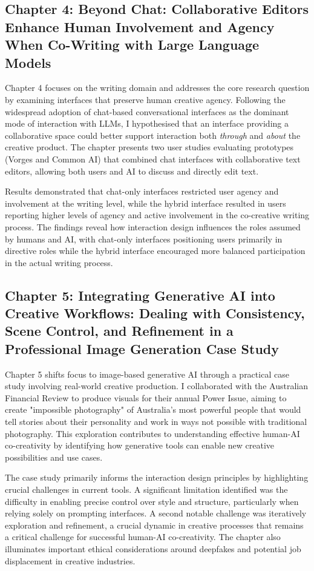 \subsection{Chapter 4: Beyond Chat: Collaborative Editors Enhance Human Involvement and Agency When Co-Writing with Large Language Models}

Chapter 4 focuses on the writing domain and addresses the core research question by examining interfaces that preserve human creative agency. Following the widespread adoption of chat-based conversational interfaces as the dominant mode of interaction with LLMs, I hypothesised that an interface providing a collaborative space could better support interaction both \textit{through} and \textit{about} the creative product. The chapter presents two user studies evaluating prototypes (Vorges and Common AI) that combined chat interfaces with collaborative text editors, allowing both users and AI to discuss and directly edit text.

Results demonstrated that chat-only interfaces restricted user agency and involvement at the writing level, while the hybrid interface resulted in users reporting higher levels of agency and active involvement in the co-creative writing process. The findings reveal how interaction design influences the roles assumed by humans and AI, with chat-only interfaces positioning users primarily in directive roles while the hybrid interface encouraged more balanced participation in the actual writing process.

\subsection{Chapter 5: Integrating Generative AI into Creative Workflows: Dealing with Consistency, Scene Control, and Refinement in a Professional Image Generation Case Study}

Chapter 5 shifts focus to image-based generative AI through a practical case study involving real-world creative production. I collaborated with the Australian Financial Review to produce visuals for their annual Power Issue, aiming to create "impossible photography" of Australia's most powerful people that would tell stories about their personality and work in ways not possible with traditional photography. This exploration contributes to understanding effective human-AI co-creativity by identifying how generative tools can enable new creative possibilities and use cases.

The case study primarily informs the interaction design principles by highlighting crucial challenges in current tools. A significant limitation identified was the difficulty in enabling precise control over style and structure, particularly when relying solely on prompting interfaces. A second notable challenge was iteratively exploration and refinement, a crucial dynamic in creative processes that remains a critical challenge for successful human-AI co-creativity. The chapter also illuminates important ethical considerations around deepfakes and potential job displacement in creative industries.

